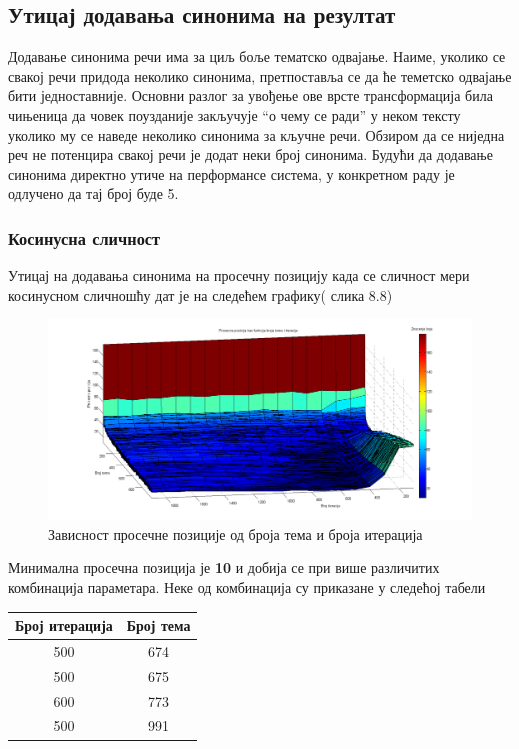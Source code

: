 \subsection{Утицај додавања синонима на резултат}

Додавање синонима речи има за циљ боље тематско одвајање. Наиме, уколико се свакој речи придода неколико синонима, претпоставља се да ће теметско одвајање бити једноставније. Основни разлог за увођење ове врсте трансформација била чињеница да  човек поузданије закључује "`о чему се ради"' у неком тексту уколико му се наведе неколико синонима за кључне речи. Обзиром да се ниједна реч не потенцира свакој речи је додат неки број синонима. Будући да додавање синонима директно утиче на перформансе система, у конкретном раду је одлучено да тај број буде 5.

 


\subsubsection{Косинусна сличност}



Утицај  на додавања синонима на просечну позицију  када се сличност мери косинусном сличношћу дат је на следећем графику( слика 8.8)

		\begin{figure}[H]
    \centering
   \includegraphics[scale=0.3]{./Slike/NoStemmSyn.png} 
	\caption{Зависност просечне позиције од броја тема и броја итерација}
	\label{fig:slika1}
\end{figure}

Минимална просечна позиција је \textbf{10} и добија се при више различитих комбинација параметара. Неке од комбинација су приказане у следећој табели

\begin{center}
\begin{tabular}{|c|c|}
\hline
Број итерација & Број тема \\
\hline\hline
500 & 674 \\
500 & 675 \\
600 & 773 \\
500 & 991 \\
\hline
\end{tabular}
\end{center}


